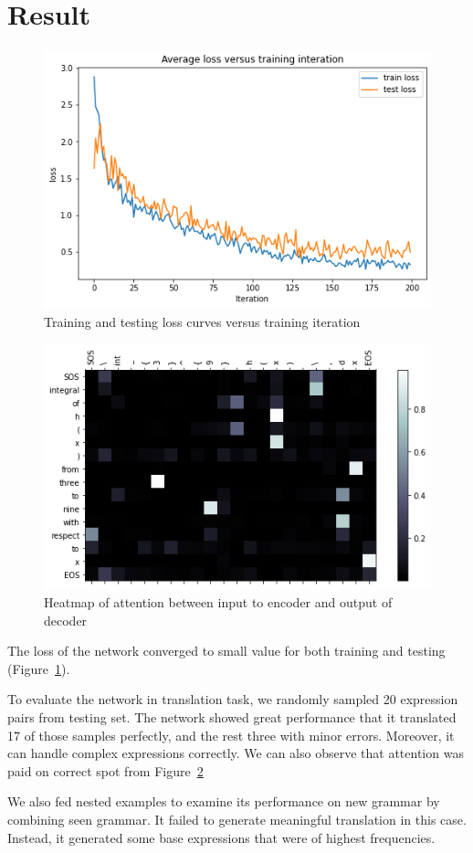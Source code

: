 \documentclass{article}
\begin{document}
\section{Result}
\begin{figure}[h]
  \centering
  \includegraphics[width=12cm]{../plot/loss_curve.png}
  \caption{Training and testing loss curves versus training iteration}
  \label{fig:loss}
\end{figure}
%
\begin{figure}[h]
  \centering
  \includegraphics[width=12cm]{../plot/attention.png}
  \caption{Heatmap of attention between input to encoder and output of decoder}
  \label{fig:att}
\end{figure}
%
The loss of the network converged to small value for both training and testing (Figure~\ref{fig:loss}). \par 
To evaluate the network in translation task, we randomly sampled 20 expression pairs from testing set. The network showed great performance that it translated 17 of those samples perfectly, and the rest three with minor errors. Moreover, it can handle complex expressions correctly. We can also observe that attention was paid on correct spot from Figure~\ref{fig:att} \par 
We also fed nested examples to examine its performance on new grammar by combining seen grammar. It failed to generate meaningful translation in this case. Instead, it generated some base expressions that were of highest frequencies. 
%
\end{document}
